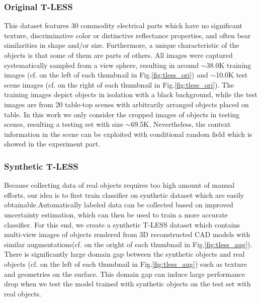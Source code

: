 

\subsubsection{Original T-LESS\cite{hodan2017tless}} \label{tless} This dataset features 30 commodity electrical parts which have no significant texture, discriminative color or distinctive reflectance properties, and often bear similarities in shape and/or size. Furthermore, a unique characteristic of the objects is that some of them are parts of others. All images were captured systematically sampled from a view sphere, resulting in around $\sim$38.0K training images (cf. on the left of each thumbnail in Fig.\ref{fig:tless_ori}) and $\sim$10.0K test scene images (cf. on the right of each thumbnail in Fig.\ref{fig:tless_ori}). The training images depict objects in isolation with a black background, while the test images are from 20 table-top scenes with arbitrarily arranged objects placed on table. In this work we only consider the cropped images of objects in testing scenes, resulting a testing set with size $\sim$69.5K. Nevertheless, the context information in the scene can be exploited with conditional random field  which is showed in the experiment part.

\subsubsection{Synthetic T-LESS}
Because collecting data of real objects requires too high amount of manual efforts, our idea is to first train classifier on synthetic dataset which are easily obtainable.Automatically labeled data can be collected based on improved uncertainty estimation, which can then be used to train a more accurate classifier.
For this end, we create a synthetic T-LESS dataset which contains multi-view images of objects rendered from 3D reconstructed CAD models with similar augmentations(cf. on the oright of each thumbnail in Fig.\ref{fig:tless_aug}). There is significantly large domain gap between the synthetic objects and real objects (cf. on the left of each thumbnail in Fig.\ref{fig:tless_aug}) such as texture and geometries on the surface. This domain gap can induce large performance drop when we test the model trained with synthetic objects on the test set with real objects. 

